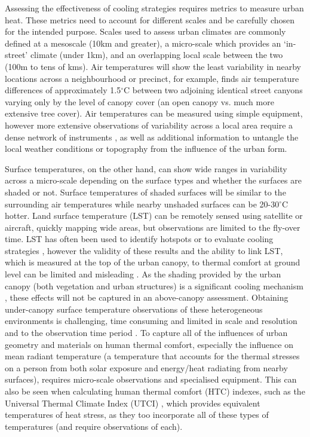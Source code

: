 \documentclass[final,3p,times,authoryear]{elsarticle}
\begin{document}
Assessing the effectiveness of cooling strategies requires metrics to measure urban heat. These metrics need to account for different scales and be carefully chosen for the intended purpose. Scales used to assess urban climates are commonly defined \citep{Oke2017} at a mesoscale (10km and greater), a micro-scale which provides an `in-street' climate (under 1km), and an overlapping local scale between the two (100m to tens of kms). Air temperatures will show the least variability in nearby locations across a neighbourhood or precinct, for example, \cite{Coutts2015} finds air temperature differences of approximately 1.5$^{\circ}$C between two adjoining identical street canyons varying only by the level of canopy cover (an open canopy vs. much more extensive tree cover). Air temperatures can be measured using simple equipment, however more extensive observations of variability across a local area require a dense network of instruments \citep{Potgieter2021}, as well as additional information to untangle the local weather conditions or topography from the influence of the urban form. 

Surface temperatures, on the other hand, can show wide ranges in variability across a micro-scale depending on the surface types and whether the surfaces are shaded or not. Surface temperatures of shaded surfaces will be similar to the surrounding air temperatures while nearby unshaded surfaces can be 20-30$^{\circ}$C hotter. Land surface temperature (LST) can be remotely sensed using satellite or aircraft, quickly mapping wide areas, but observations are limited to the fly-over time. LST has often been used to identify hotspots \citep{Aniello1995} or to evaluate cooling strategies \citep{Zhu2012a,Duncan2018,Manoli2019,Ossola2021}, however the validity of these results and the ability to link LST, which is measured at the top of the urban canopy, to thermal comfort at ground level can be limited and misleading \citep{Coutts2016d}. As the shading provided by the urban canopy (both vegetation and urban structures) is a significant cooling mechanism \citep{Coutts2015,Lee2018,Krayenhoff2021}, these effects will not be captured in an above-canopy assessment. Obtaining under-canopy surface temperature observations of these heterogeneous environments is challenging, time consuming and limited in scale and resolution and to the observation time period \citep{Middel2019a}. To capture all of the influences of urban geometry and materials on human thermal comfort, especially the influence on mean radiant temperature \citep{Kantor2011} (a temperature that accounts for the thermal stresses on a person from both solar exposure and energy/heat radiating from nearby surfaces), requires micro-scale observations and specialised equipment. This can also be seen when calculating human thermal comfort (HTC) indexes, such as the Universal Thermal Climate Index (UTCI) \citep{Brode2012a}, which provides equivalent temperatures of heat stress, as they too incorporate all of these types of temperatures (and require observations of each).
\end{document}
